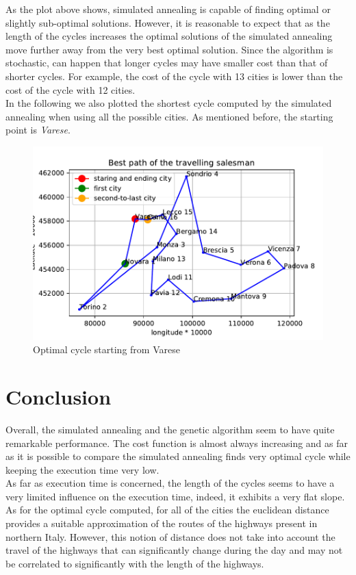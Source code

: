 \documentclass{article}
\begin{document}
\noindent As the plot above shows, simulated annealing is capable of finding optimal or slightly sub-optimal solutions. However, it is reasonable to expect that as the length of the cycles increases the optimal solutions of the simulated annealing move further away from the very best optimal solution. Since the algorithm is stochastic, can happen that longer cycles may have smaller cost than that of shorter cycles. For example, the cost of the cycle with 13 cities is lower than the cost of the cycle with 12 cities.\\
In the following we also plotted the shortest cycle computed by the simulated annealing when using all the possible cities. As mentioned before, the starting point is \textit{Varese}.
\begin{figure}[H]
\includegraphics[scale=0.8]{../path.pdf} 
\centering
\caption{Optimal cycle starting from Varese}
\end{figure}

\section{Conclusion}
Overall, the simulated annealing and the genetic algorithm seem to have quite remarkable performance. The cost function is almost always increasing and as far as it is possible to compare the simulated annealing finds very optimal cycle while keeping the execution time very low. \\
As far as execution time is concerned, the length of the cycles seems to have a very limited influence on the execution time, indeed, it exhibits a very flat slope. \\
As for the optimal cycle computed, for all of the cities the euclidean distance provides a suitable approximation of the routes of the highways present in northern Italy. However, this notion of distance does not take into account the travel of the highways that can significantly change during the day and may not be correlated to significantly with the length of the highways. 
\end{document}
